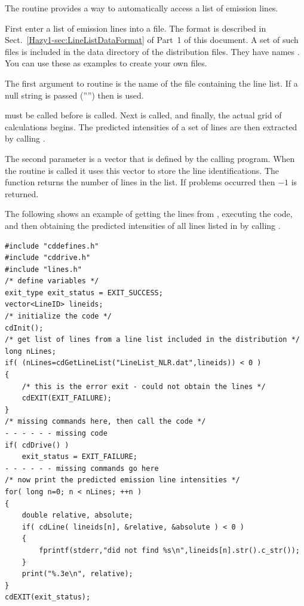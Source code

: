 The routine  provides a way
to automatically access a list of emission lines.

First enter a list of emission lines into a file.
The format is described in Sect.~\ref{Hazy1-sec:LineListDataFormat} of Part~1 of this document.
A set of such files is included
in the data directory of the distribution files.  They have names
.  You can use these as examples to create your own files.

The first argument to routine  is the name of the file
containing the line list.  If a null string is passed ('''') then
 is used.

 must be called before  is called.
Next 
is called, and finally, the actual grid of calculations begins.  The
predicted intensities of a set of lines are then extracted by calling
.

The second parameter is a vector that is defined
by the calling program.
When the routine  is called it uses this
vector to store the line identifications.  The function returns
the number of lines in the list.  If problems occurred then $-1$ is returned.

The following shows an example of getting the lines from
,
executing the code, and then obtaining the predicted intensities of all
lines listed in 
by calling .
\begin{verbatim}
#include "cddefines.h"
#include "cddrive.h"
#include "lines.h"
/* define variables */
exit_type exit_status = EXIT_SUCCESS;
vector<LineID> lineids;
/* initialize the code */
cdInit();
/* get list of lines from a line list included in the distribution */
long nLines;
if( (nLines=cdGetLineList("LineList_NLR.dat",lineids)) < 0 )
{
    /* this is the error exit - could not obtain the lines */
    cdEXIT(EXIT_FAILURE);
}
/* missing commands here, then call the code */
- - - - - - missing code
if( cdDrive() )
    exit_status = EXIT_FAILURE;
- - - - - - missing commands go here
/* now print the predicted emission line intensities */
for( long n=0; n < nLines; ++n )
{
    double relative, absolute;
    if( cdLine( lineids[n], &relative, &absolute ) < 0 )
    {
        fprintf(stderr,"did not find %s\n",lineids[n].str().c_str());
    }
    print("%.3e\n", relative);
}
cdEXIT(exit_status);
\end{verbatim}

